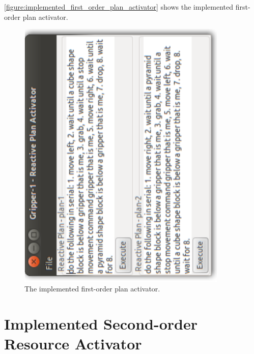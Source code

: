 {\mbox{\autoref{figure:implemented_first_order_plan_activator}}} shows
the implemented first-order plan activator.
\begin{figure}
\includegraphics[width=10cm]{gfx/implemented_first_order_plan_activator}
\caption[The implemented first-order plan activator.]{The implemented
  first-order plan activator.}
\label{figure:implemented_first_order_plan_activator}
\end{figure}

\section{Implemented Second-order Resource Activator}

